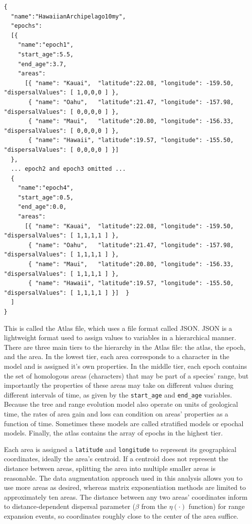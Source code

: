 \documentclass[11pt]{article}
\begin{document}
\begin{framed}
\begin{lstlisting}
{
  "name":"HawaiianArchipelago10my",
  "epochs":
  [{
    "name":"epoch1",
    "start_age":5.5,
    "end_age":3.7,
    "areas":
      [{ "name": "Kauai",  "latitude":22.08, "longitude": -159.50,  "dispersalValues": [ 1,0,0,0 ] },
       { "name": "Oahu",   "latitude":21.47, "longitude": -157.98, "dispersalValues": [ 0,0,0,0 ] },
       { "name": "Maui",   "latitude":20.80, "longitude": -156.33, "dispersalValues": [ 0,0,0,0 ] },
       { "name": "Hawaii", "latitude":19.57, "longitude": -155.50, "dispersalValues": [ 0,0,0,0 ] }]
  },
  ... epoch2 and epoch3 omitted ...
  {
    "name":"epoch4",
    "start_age":0.5,
    "end_age":0.0,
    "areas":
      [{ "name": "Kauai",  "latitude":22.08, "longitude": -159.50,  "dispersalValues": [ 1,1,1,1 ] },
       { "name": "Oahu",   "latitude":21.47, "longitude": -157.98, "dispersalValues": [ 1,1,1,1 ] },
       { "name": "Maui",   "latitude":20.80, "longitude": -156.33, "dispersalValues": [ 1,1,1,1 ] },
       { "name": "Hawaii", "latitude":19.57, "longitude": -155.50, "dispersalValues": [ 1,1,1,1 ] }]  }
  ]
}
\end{lstlisting}
\end{framed}

This is called the Atlas file, which uses a file format called JSON.
JSON is a lightweight format used to assign values to variables in a hierarchical manner.
There are three main tiers to the hierarchy in the Atlas file: the atlas, the epoch, and the area.
In the lowest tier, each area corresponds to a character in the model and is assigned it's own properties.
In the middle tier, each epoch contains the set of homologous areas (characters) that may be part of a species' range, but importantly the properties of these areas may take on different values during different intervals of time, as given by the {\tt start\_age} and {\tt end\_age} variables.
Because the tree and range evolution model also operate on units of geological time, the rates of area gain and loss can condition on areas' properties as a function of time.
Sometimes these models are called stratified models or epochal models.
Finally, the atlas contains the array of epochs in the highest tier.

Each area is assigned a {\tt latitude} and {\tt longitude} to represent its geographical coordinates, ideally the area's centroid.
If a centroid does not represent the distance between areas, splitting the area into multiple smaller areas is reasonable.
The data augmentation approach used in this analysis allows you to use more areas as desired, whereas matrix exponentiation methods are limited to approximately ten areas.
The distance between any two areas' coordinates inform to distance-dependent dispersal parameter ($\beta$ from the $\eta(\cdot)$ function) for range expansion events, so coordinates roughly close to the center of the area suffice.
\end{document}
